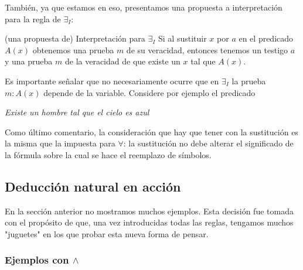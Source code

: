 \documentclass{article}
\begin{document}
También, ya que estamos en eso, presentamos una propuesta a interpretación para
la regla de $\exists_I$:

\begin{sfwt}{(una propuesta de) Interpretación para $\exists_I$}
    Si al sustituir $x$ por $a$ en el predicado $A(x)$ obtenemos una
    prueba $m$ de su veracidad, entonces tenemos un testigo $a$ y una prueba
    $m$ de la veracidad de que existe un $x$ tal que $A(x)$.
\end{sfwt}

\begin{remark}
    Es importante señalar que no necesariamente ocurre que en $\exists_I$
    la prueba $m : A(x)$ depende de la variable. Considere por ejemplo
    el predicado
    \begin{center}
        \textit{Existe un hombre tal que el cielo es azul}
    \end{center}
\end{remark}

Como último comentario, la consideración que hay que tener con la sustitución es la misma que la impuesta para $\forall$: la sustitución no debe alterar el significado de la fórmula sobre la cual se hace el reemplazo de símbolos.
\subsection{Deducción natural en acción}
\label{subsection:deduccion-nat-accion}

En la sección anterior no mostramos muchos ejemplos. Esta decisión fue tomada con el propósito de que, una vez introducidas todas las reglas, tengamos muchos "juguetes" en los que probar esta nueva forma de pensar.

\subsubsection{Ejemplos con $\wedge$}
\end{document}
